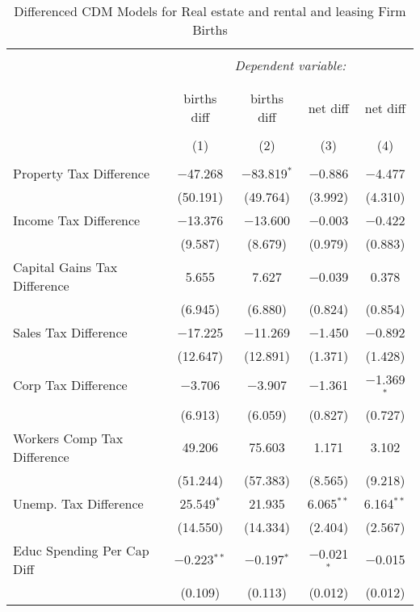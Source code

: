 
\begin{table}[!htbp] \centering 
  \caption{Differenced CDM Models for  Real estate and rental and leasing Firm Births} 
  \label{} 
\begin{tabular}{@{\extracolsep{5pt}}lcccc} 
\\[-1.8ex]\hline 
\hline \\[-1.8ex] 
 & \multicolumn{4}{c}{\textit{Dependent variable:}} \\ 
\cline{2-5} 
\\[-1.8ex] & \multicolumn{4}{c}{ } \\ 
 & births diff & births diff & net diff & net diff \\ 
\\[-1.8ex] & (1) & (2) & (3) & (4)\\ 
\hline \\[-1.8ex] 
 Property Tax Difference & $-$47.268 & $-$83.819$^{*}$ & $-$0.886 & $-$4.477 \\ 
  & (50.191) & (49.764) & (3.992) & (4.310) \\ 
  Income Tax Difference & $-$13.376 & $-$13.600 & $-$0.003 & $-$0.422 \\ 
  & (9.587) & (8.679) & (0.979) & (0.883) \\ 
  Capital Gains Tax Difference & 5.655 & 7.627 & $-$0.039 & 0.378 \\ 
  & (6.945) & (6.880) & (0.824) & (0.854) \\ 
  Sales Tax Difference & $-$17.225 & $-$11.269 & $-$1.450 & $-$0.892 \\ 
  & (12.647) & (12.891) & (1.371) & (1.428) \\ 
  Corp Tax Difference & $-$3.706 & $-$3.907 & $-$1.361 & $-$1.369$^{*}$ \\ 
  & (6.913) & (6.059) & (0.827) & (0.727) \\ 
  Workers Comp Tax Difference & 49.206 & 75.603 & 1.171 & 3.102 \\ 
  & (51.244) & (57.383) & (8.565) & (9.218) \\ 
  Unemp. Tax Difference & 25.549$^{*}$ & 21.935 & 6.065$^{**}$ & 6.164$^{**}$ \\ 
  & (14.550) & (14.334) & (2.404) & (2.567) \\ 
  Educ Spending Per Cap Diff & $-$0.223$^{**}$ & $-$0.197$^{*}$ & $-$0.021$^{*}$ & $-$0.015 \\ 
  & (0.109) & (0.113) & (0.012) & (0.012) \\ 

\end{tabular}
\end{table}

